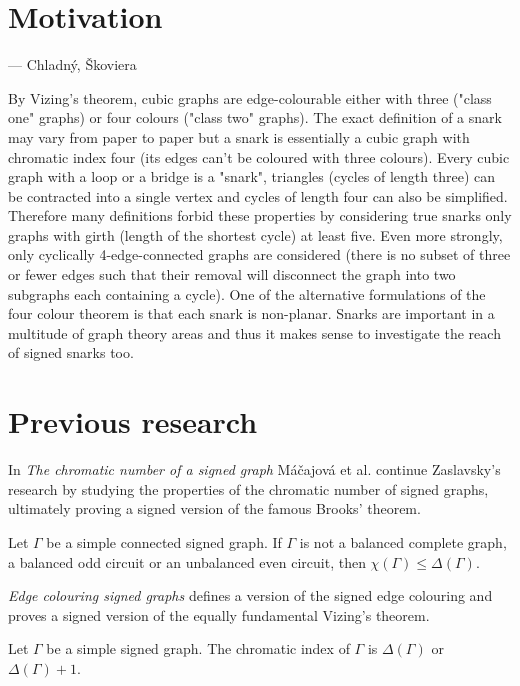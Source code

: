 \section{Motivation}

 --- Chladný, Škoviera \cite{skoviera-citat}

By Vizing's theorem, cubic graphs are edge-colourable either with three ("class one" graphs) or four colours ("class two" graphs). The exact definition of a snark may vary from paper to paper but a snark is essentially a cubic graph with chromatic index four (its edges can't be coloured with three colours). Every cubic graph with a loop or a bridge is a "snark", triangles (cycles of length three) can be contracted into a single vertex and cycles of length four can also be simplified. Therefore many definitions forbid these properties by considering true snarks only graphs with girth (length of the shortest cycle) at least five. Even more strongly, only cyclically 4-edge-connected graphs are considered (there is no subset of three or fewer edges such that their removal will disconnect the graph into two subgraphs each containing a cycle). One of the alternative formulations of the four colour theorem is that each snark is non-planar. Snarks are important in a multitude of graph theory areas and thus it makes sense to investigate the reach of signed snarks too.

\section{Previous research}

In \textit{The chromatic number of a signed graph}\cite{chromatic-number} Máčajová et al. continue Zaslavsky's research by studying the properties of the chromatic number of signed graphs, ultimately proving a signed version of the famous Brooks'\cite{brooks} theorem.

\begin{theorem}\label{th:brooks}
    Let $\Gamma$ be a simple connected signed graph. If $\Gamma$ is not a balanced complete graph, a balanced odd circuit or an unbalanced even circuit, then $\chi(\Gamma) \leq \Delta(\Gamma)$.
\end{theorem}

\textit{Edge colouring signed graphs} defines a version of the signed edge colouring and proves a signed version of the equally fundamental Vizing's theorem.

\begin{theorem}\label{th:vizing}
    Let $\Gamma$ be a simple signed graph. The chromatic index of $\Gamma$ is $\Delta(\Gamma)$ or $\Delta(\Gamma) + 1$.
\end{theorem}
